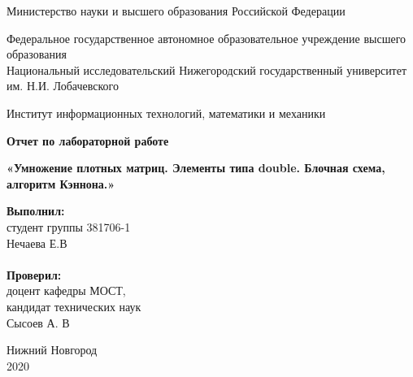 \documentclass{report}
\begin{document}
\begin{titlepage}

\begin{center}
Министерство науки и высшего образования Российской Федерации
\end{center}

\begin{center}
Федеральное государственное автономное образовательное учреждение высшего образования \\
Национальный исследовательский Нижегородский государственный университет им. Н.И. Лобачевского
\end{center}

\begin{center}
Институт информационных технологий, математики и механики
\end{center}

\vspace{3em}

\begin{center}
\textbf{\Large Отчет по лабораторной работе}
\end{center}
\begin{center}
\textbf{\Large«Умножение плотных матриц. Элементы типа double. Блочная схема, алгоритм Кэннона.»}
\end{center}

\vspace{3em}

\newbox{\lbox}
\newlength{\maxl}
\setlength{\maxl}{\wd\lbox}
\hfill\parbox{7cm}{
\hspace*{5cm}\hspace*{-5cm}\textbf{Выполнил:} \\ студент группы 381706-1 \\ Нечаева Е.В\\
\\
\hspace*{5cm}\hspace*{-5cm}\textbf{Проверил:}\\ доцент кафедры МОСТ, \\ кандидат технических наук \\ Сысоев А. В
}
\vspace{\fill}
\begin{center} Нижний Новгород \\ 2020 \end{center}
\end{titlepage}

\setcounter{page}{2}
\setcounter{secnumdepth}{-1}
\tableofcontents
\end{document}
